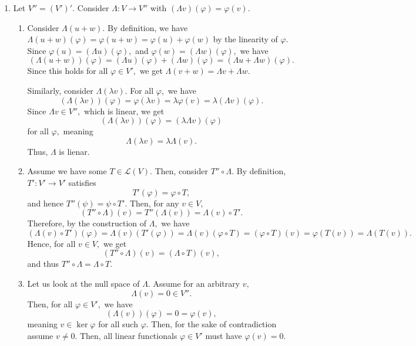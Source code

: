 \documentclass[12pt]{article}
\begin{document}
\begin{enumerate}
\begin{enumerate}
        Since these vector spaces have the same dimension, and one is
        a subset of the other, we have
        $$
        U^{0} + W^{0} = (U \cap W)^{0}.
        $$
    \end{enumerate}

  \item Let $V'' = (V')'.$ Consider $
    \Lambda : V \to V''
    $ with $(\Lambda v)(\varphi) = \varphi(v).$
    \begin{enumerate}
      \item Consider $\Lambda(u + w).$ By definition, we have
        $\Lambda(u + w)(\varphi) = \varphi(u + w) = \varphi(u) +
        \varphi(w)$ by the linearity of $\varphi.$ Since $\varphi(u)
        = (\Lambda u)(\varphi),$ and $\varphi(w) = (\Lambda
        w)(\varphi),$ we have
        $$
        (\Lambda(u + w))(\varphi) = (\Lambda u)(\varphi) + (\Lambda
        w)(\varphi) = (\Lambda u + \Lambda w)(\varphi).
        $$
        Since this holds for all $\varphi \in V',$ we get $\Lambda (v
        + w) = \Lambda v + \Lambda w.$

        Similarly, consider $\Lambda(\lambda v).$ For all $\varphi, $ we have
        $$
        (\Lambda(\lambda v))(\varphi) =\varphi(\lambda v) = \lambda
        \varphi(v) = \lambda (\Lambda v)(\varphi).
        $$ Since $\Lambda v \in V'',$ which is linear,  we get
        $$
        (\Lambda(\lambda v))(\varphi) = (\lambda \Lambda v)(\varphi)
        $$
        for all $\varphi,$ meaning
        $$
        \Lambda(\lambda v) = \lambda \Lambda(v).
        $$
        Thus, $\Lambda$ is lienar.

      \item Assume we have some $T \in \mathcal L(V).$ Then, consider
        $T'' \circ \Lambda.$ By definition, $T': V' \to V'$ satisfies
        $$
        T'(\varphi) = \varphi \circ T,
        $$
        and hence $T''(\psi) = \psi \circ T'.$ Then,  for any $v \in V,$
        $$
        (T'' \circ \Lambda)(v) = T''(\Lambda(v)) = \Lambda (v) \circ  T'.
        $$
        Therefore,  by the construction of $\Lambda,$ we have
        $$
        (\Lambda(v) \circ T')(\varphi) = \Lambda(v)(T'(\varphi)) =
        \Lambda(v)(\varphi \circ T) = (\varphi \circ T)(v) =
        \varphi(T(v)) = \Lambda(T(v)).
        $$
        Hence, for all $v \in V,$ we get
        $$
        (T'' \circ \Lambda)(v) = (\Lambda \circ T)(v),
        $$
        and thus $T'' \circ \Lambda = \Lambda \circ T.$

      \item Let us look at the null space of $\Lambda.$ Assume for an
        arbitrary $v,$
        $$
        \Lambda(v) = 0 \in V''.
        $$
        Then, for all $\varphi \in V',$ we have
        $$
        (\Lambda(v))(\varphi) = 0 = \varphi(v),
        $$
        meaning $v \in \ker \varphi$ for all such $\varphi.$ Then,
        for the sake of contradiction assume $v \neq 0.$ Then, all
        linear functionals $\varphi \in V'$ must have $\varphi(v) =0.$


\end{enumerate}
\end{enumerate}
\end{document}
